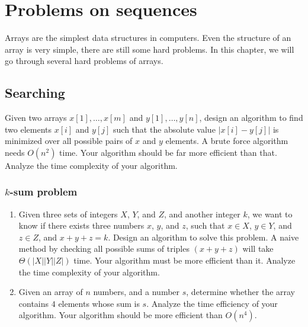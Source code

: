 \chapter{Problems on sequences}
\begin{refsection}

Arrays are the simplest data structures in computers. Even the structure of an array is very simple, there are still some hard problems. In this chapter, we will go through several hard problems of arrays.

\section{Searching}

\begin{Exercise}
Given two arrays $x[1], \dots, x[m]$ and $y[1], \dots, y[n]$, design an algorithm to find two elements $x[i]$ and $y[j]$ such that the absolute value $|x[i] - y[j]|$ is minimized over all possible pairs of $x$ and $y$ elements. A brute force algorithm needs $O(n^2)$ time. Your algorithm should be far more efficient than that. Analyze the time complexity of your algorithm.
\end{Exercise}
\begin{Answer}
\end{Answer}

\subsection{$k$-sum problem}

\begin{Exercise}
\begin{enumerate}
\item Given three sets of integers $X$, $Y$, and $Z$, and another integer $k$, we want to know if there exists three numbers $x$, $y$, and $z$, such that $x \in X$, $y \in Y$, and $z \in Z$, and $x + y + z = k$. Design an algorithm to solve this problem. A naive method by checking all possible sums of triples $(x+y+z)$ will take $\Theta(|X||Y||Z|)$ time. Your algorithm must be more efficient than it. Analyze the time complexity of your algorithm.
\item Given an array of $n$ numbers, and a number $s$, determine whether the array contains $4$ elements whose sum is $s$. Analyze the time efficiency of your algorithm. Your algorithm should be more efficient than $O(n^4)$. 
\end{enumerate}
\end{Exercise}
\begin{Answer}
\end{Answer}



\end{refsection}
